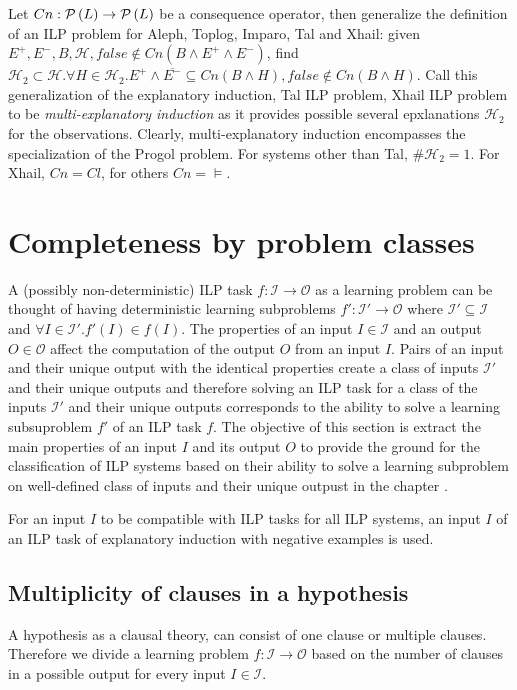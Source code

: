 Let $Cn:\mathcal{P} \left({ L }\right) \to \mathcal{P} \left({ L }\right)$ be a consequence operator, then generalize the definition of an ILP problem for Aleph, Toplog, Imparo, Tal and Xhail:
given $E^{+}, E^{-}, B, \mathcal{H}, false \not\in Cn(B \land E^{+} \land E^{-})$,
find $\mathcal{H}_2 \subset \mathcal{H}. \forall H \in \mathcal{H}_2. E^{+} \land \overline{E^{-}} \subseteq Cn(B \land H), false \not\in Cn(B \land H)$. Call this generalization of the explanatory induction, Tal ILP problem, Xhail ILP problem to be \emph{multi-explanatory induction} as it provides possible several epxlanations $\mathcal{H}_2$ for the observations. Clearly, multi-explanatory induction encompasses the specialization of the Progol problem. For systems other than Tal, $\#\mathcal{H}_2=1$. For Xhail, $Cn=Cl$, for others $Cn=\models$.

\section{Completeness by problem classes}
A (possibly non-deterministic) ILP task $f:\mathcal{I} \to \mathcal{O}$ as a learning problem can be thought of having deterministic learning subproblems $f':\mathcal{I}' \to \mathcal{O}$ where $\mathcal{I}' \subseteq \mathcal{I}$ and $\forall I \in \mathcal{I}'. f'(I) \in f(I)$. The properties of an input $I \in \mathcal{I}$ and an output $O \in \mathcal{O}$ affect the computation of the output $O$ from an input $I$. Pairs of an input and their unique output with the identical properties create a class of inputs $\mathcal{I}'$ and their unique outputs and therefore solving an ILP task for a class of the inputs $\mathcal{I}'$ and their unique outputs corresponds to the ability to solve a learning subsuproblem $f'$ of an ILP task $f$. The objective of this section is extract the main properties of an input $I$ and its output $O$ to provide the ground for the classification of ILP systems based on their ability to solve a learning subproblem on well-defined class of inputs and their unique outpust in the chapter .

For an input $I$ to be compatible with ILP tasks for all ILP systems, an input $I$ of an ILP task of explanatory induction with negative examples  is used.

\subsection{Multiplicity of clauses in a hypothesis}
A hypothesis as a clausal theory, can consist of one clause or multiple clauses. Therefore we divide a learning problem $f:\mathcal{I} \to \mathcal{O}$ based on the number of clauses in a possible output for every input $I \in \mathcal{I}$.

